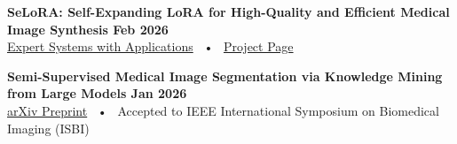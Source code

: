 \textbf{SeLoRA: Self-Expanding LoRA for High-Quality and Efficient Medical Image Synthesis \hfill Feb 2026}
\\
\href{https://www.sciencedirect.com/science/article/pii/S0957417426004823?dgcid=author}{Expert Systems with Applications} ~•~
\href{https://yuchen20.github.io/SeLoRA.github.io/}{Project Page}

\textbf{Semi-Supervised Medical Image Segmentation via Knowledge Mining from Large Models \hfill Jan 2026}
\\
\href{https://arxiv.org/abs/2503.06816}{arXiv Preprint} ~•~
Accepted to IEEE International Symposium on Biomedical Imaging (ISBI)

